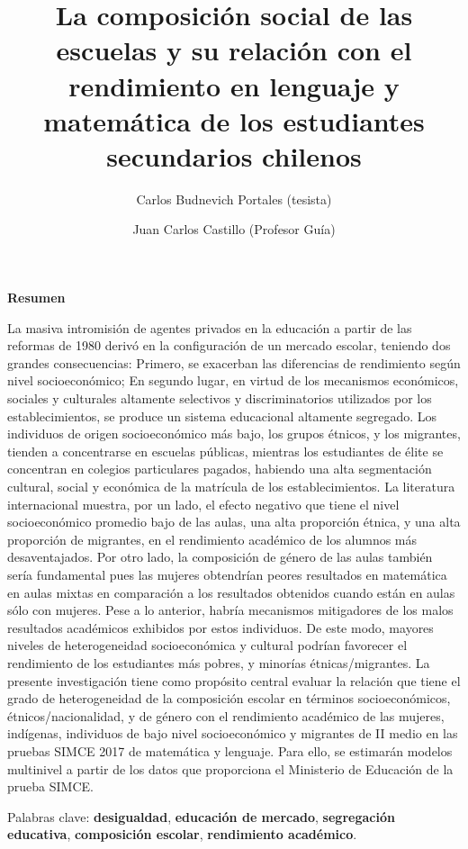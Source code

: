 \documentclass[
]{article}
\title{La composición social de las escuelas y su relación con el rendimiento
en lenguaje y matemática de los estudiantes secundarios chilenos}
\author{Carlos Budnevich Portales (tesista) \and Juan Carlos Castillo (Profesor Guía)}
\date{}
\begin{document}
\maketitle

\pagebreak

\textbf{Resumen}

La masiva intromisión de agentes privados en la educación a partir de
las reformas de 1980 derivó en la configuración de un mercado escolar,
teniendo dos grandes consecuencias: Primero, se exacerban las
diferencias de rendimiento según nivel socioeconómico; En segundo lugar,
en virtud de los mecanismos económicos, sociales y culturales altamente
selectivos y discriminatorios utilizados por los establecimientos, se
produce un sistema educacional altamente segregado. Los individuos de
origen socioeconómico más bajo, los grupos étnicos, y los migrantes,
tienden a concentrarse en escuelas públicas, mientras los estudiantes de
élite se concentran en colegios particulares pagados, habiendo una alta
segmentación cultural, social y económica de la matrícula de los
establecimientos. La literatura internacional muestra, por un lado, el
efecto negativo que tiene el nivel socioeconómico promedio bajo de las
aulas, una alta proporción étnica, y una alta proporción de migrantes,
en el rendimiento académico de los alumnos más desaventajados. Por otro
lado, la composición de género de las aulas también sería fundamental
pues las mujeres obtendrían peores resultados en matemática en aulas
mixtas en comparación a los resultados obtenidos cuando están en aulas
sólo con mujeres. Pese a lo anterior, habría mecanismos mitigadores de
los malos resultados académicos exhibidos por estos individuos. De este
modo, mayores niveles de heterogeneidad socioeconómica y cultural
podrían favorecer el rendimiento de los estudiantes más pobres, y
minorías étnicas/migrantes. La presente investigación tiene como
propósito central evaluar la relación que tiene el grado de
heterogeneidad de la composición escolar en términos socioeconómicos,
étnicos/nacionalidad, y de género con el rendimiento académico de las
mujeres, indígenas, individuos de bajo nivel socioeconómico y migrantes
de II medio en las pruebas SIMCE 2017 de matemática y lenguaje. Para
ello, se estimarán modelos multinivel a partir de los datos que
proporciona el Ministerio de Educación de la prueba SIMCE.

Palabras clave: \textbf{desigualdad}, \textbf{educación de mercado},
\textbf{segregación educativa}, \textbf{composición escolar},
\textbf{rendimiento académico}.
\end{document}
